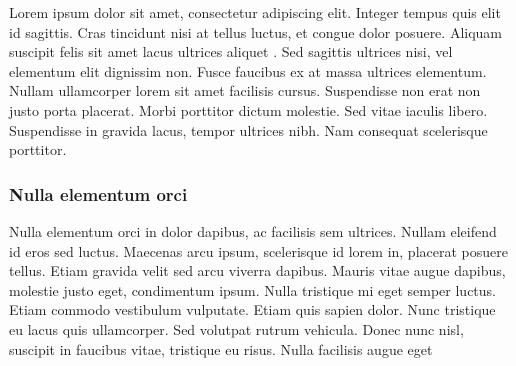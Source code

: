 Lorem ipsum dolor sit amet, consectetur adipiscing elit. Integer tempus quis elit id sagittis. Cras tincidunt nisi at tellus luctus, et congue dolor posuere. Aliquam suscipit felis sit amet lacus ultrices aliquet . Sed sagittis ultrices nisi, vel elementum elit dignissim non. Fusce faucibus ex at massa ultrices elementum. Nullam ullamcorper lorem sit amet facilisis cursus. Suspendisse non erat non justo porta placerat. Morbi porttitor dictum molestie. Sed vitae iaculis libero. Suspendisse in gravida lacus, tempor ultrices nibh. Nam consequat scelerisque porttitor.

\subsubsection{Nulla elementum orci}

Nulla elementum orci in dolor dapibus, ac facilisis sem ultrices. Nullam eleifend id eros sed luctus. Maecenas arcu ipsum, scelerisque id lorem in, placerat posuere tellus. Etiam gravida velit sed arcu viverra dapibus. Mauris vitae augue dapibus, molestie justo eget, condimentum ipsum. Nulla tristique mi eget semper luctus. Etiam commodo vestibulum vulputate. Etiam quis sapien dolor. Nunc tristique eu lacus quis ullamcorper. Sed volutpat rutrum vehicula. Donec nunc nisl, suscipit in faucibus vitae, tristique eu risus. Nulla facilisis augue eget


